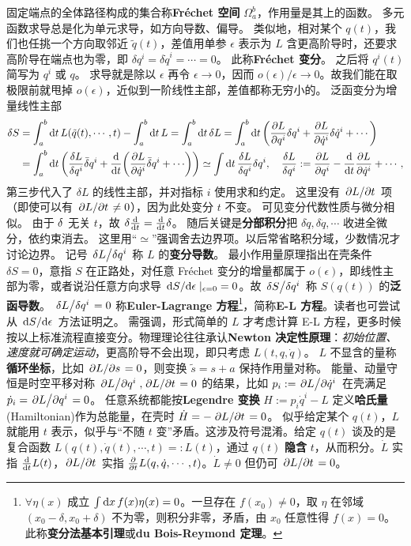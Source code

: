 固定端点的全体路径构成的集合称\textbf{Fréchet 空间} $\Omega_a^b$，作用量是其上的函数。
多元函数求导总是化为单元求导，如方向导数、偏导。
类似地，相对某个 $q(t)$，我们也任挑一个方向取邻近 $\tilde q(t)$，差值用单参 $\epsilon$ 表示为
$L$ 含更高阶导时，还要求高阶导在端点也为零，即 $\delta q^i=\delta\dot q^i=\cdots=0$。
此称\textbf{Fréchet 变分}。
之后将 $q^i(t)$ 简写为 $q^i$ 或 $q$。
求导就是除以 $\epsilon$ 再令 $\epsilon\to 0$，因而 $o(\epsilon)/\epsilon\to 0$。故我们能在取极限前就甩掉 $o(\epsilon)$，近似到一阶线性主部，差值都称无穷小的。
泛函变分为增量线性主部
\begin{align*}
    \var S&=\int_{a}^{b}\d{t} L(\tilde q(t),\cdots,t) - \int_a^b\d{t} L=\int_a^b\d{t} \delta L=\int_a^b\d t \left(\pdv{L}{q^i}\delta q^i+\pdv{L}{\dot q^i}\delta \dot q^i + \cdots\right)\\
    &=\int_a^b\d t \left(\fdv{L}{q^i}\bar\delta q^i + \dv{t}(\pdv{L}{\dot q^i}\bar\delta q^i +\cdots )\right) \simeq \int\d{t} \fdv{L}{q^i} \delta q^i,\quad \fdv{L}{q^i} := \pdv{L}{q^i}-\dv{t}\pdv{L}{\dot q^i} + \cdots,
\end{align*}
第三步代入了 $\delta L$ 的线性主部，并对指标 $i$ 使用求和约定。
这里没有 $\pdv*{L}{t}$ 项（即使可以有 $\pdv*{L}{t}\ne 0$），因为此处变分 $t$ 不变。
可见变分代数性质与微分相似。
由于 $\var$ 无关 $t$，故 $\var\dv{t} =\dv{t}\var$。
随后关键是\textbf{分部积分}把 $\delta\dot q,\delta\ddot q,\cdots$ 收进全微分，依约束消去。
这里用“$\simeq$”强调舍去边界项。以后常省略积分域，少数情况才讨论边界。
记号 $\fdv*{L}{q^i}$ 称 $L$ 的\textbf{变分导数}。
最小作用量原理指出在壳条件 $\delta S=0$，意指 $S$ 在正路处，对任意 Fréchet 变分的增量都属于 $o(\epsilon)$，即线性主部为零，或者说沿任意方向求导 $\dv*{S}{\epsilon}|_{\epsilon=0}=0$。故
$\fdv*{S}{q^i}$ 称 $S(q(t))$ 的\textbf{泛函导数}。
$\fdv*{L}{q^i} = 0$ 称\textbf{Euler-Lagrange 方程}\footnote{$\forall\eta(x)$ 成立 $\int\dd{x} f(x)\eta(x)=0$。一旦存在 $f(x_0)\ne 0$，取 $\eta$ 在邻域 $(x_0-\delta,x_0+\delta)$ 不为零，则积分非零，矛盾，由 $x_0$ 任意性得 $f(x)=0$。此称\textbf{变分法基本引理}或\textbf{du Bois-Reymond 定理}。}，简称\textbf{E-L 方程}。读者也可尝试从 $\dv*{S}{\epsilon}$ 方法证明之。
需强调，形式简单的 $L$ 才考虑计算 E-L 方程，更多时候按以上标准流程直接变分。物理理论往往承认\textbf{Newton 决定性原理}：\textit{初始位置、速度就可确定运动}，更高阶导不会出现，即只考虑 $L(t,q,\dot q)$。
$L$ 不显含的量称\textbf{循环坐标}，比如 $\pdv*{L}{s}=0$，则变换 $\tilde s=s+a$ 保持作用量对称。
能量、动量守恒是时空平移对称 $\pdv*{L}{q^i},\pdv*{L}{t}=0$ 的结果，比如 $p_i:=\pdv*{L}{\dot q^i}$ 在壳满足 $\dot p_i=\pdv*{L}{q^i}=0$。
任意系统都能按\textbf{Legendre 变换} $H:=p_i\dot q^i-L$ 定义\textbf{哈氏量}(Hamiltonian)作为总能量，在壳时 $\dot H=-\pdv*{L}{t}=0$。
似乎给定某个 $q(t)$，$L$ 就能用 $t$ 表示，似乎与“不随 $t$ 变”矛盾。这涉及符号混淆。给定 $q(t)$ 谈及的是复合函数 $L(q(t),\dot q(t),\cdots,t) =: L(t)$，通过 $q(t)$ \textbf{隐含} $t$，从而积分。$\dot L$ 实指 $\dv{t}L(t)$，$\pdv*{L}{t}$ 实指 $\pdv{t}L(q,\dot q,\cdots,t)$。$\dot L\ne 0$ 但仍可 $\pdv*{L}{t}=0$。

